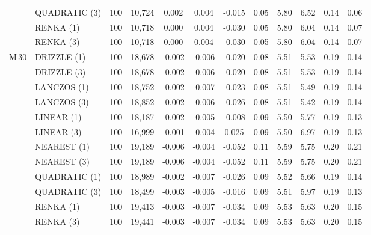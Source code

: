 \begin{table}
\begin{center}
\begin{tabular}{|l|l|c|c|c|c|c|c|c|c|c|c|}
 	              	& QUADRATIC (3)  & 100 	& 10,724 	& 0.002        & 0.004  	& -0.015 & 0.05          & 5.80  	& 6.52   		& 0.14    & 0.06    \\
 	              	& RENKA (1)           & 100 	& 10,718 	& 0.000        & 0.004  	& -0.030 & 0.05          & 5.80  	& 6.04 		& 0.14    & 0.07    \\
                		& RENKA (3)           & 100  	& 10,718 	& 0.000        & 0.004  	& -0.030 & 0.05          & 5.80  	& 6.04  		& 0.14    & 0.07    \\
\midrule
M\,30         	& DRIZZLE (1)        & 100   	& 18,678 	& -0.002       & -0.006  	& -0.020 & 0.08          & 5.51    & 5.53  		& 0.19    & 0.14    \\
 	   	       	& DRIZZLE (3)        & 100  	& 18,678 	& -0.002       & -0.006  	& -0.020 & 0.08 	 & 5.51    & 5.53  		& 0.19    & 0.14  \\
 	               	& LANCZOS (1)      & 100  	& 18,752 	& -0.002       & -0.007  	& -0.023 & 0.08          & 5.51    & 5.49  		& 0.19    & 0.14    \\
 	   	      	& LANCZOS (3)      & 100  	& 18,852 	& -0.002       & -0.006  	& -0.026 & 0.08          & 5.51    & 5.42  		& 0.19    & 0.14    \\
 	              	& LINEAR (1)          & 100    	& 18,187 	& -0.002       & -0.005  	& -0.008 & 0.09          & 5.50    & 5.77  		& 0.19    & 0.13    \\
 	              	& LINEAR (3)          & 100    	& 16,999 	& -0.001       & -0.004 	&  0.025 & 0.09          & 5.50    & 6.97 		& 0.19    & 0.13    \\
 	              	& NEAREST (1)      & 100   	& 19,189 	& -0.006       & -0.004 	& -0.052 & 0.11          & 5.59    & 5.75  		& 0.20    & 0.21    \\
 	              	& NEAREST (3)      & 100   	& 19,189 	& -0.006       & -0.004  	& -0.052 & 0.11          & 5.59    & 5.75  		& 0.20    & 0.21    \\
 	              	& QUADRATIC (1)  & 100 	& 18,989 	& -0.002       & -0.007  	& -0.026 & 0.09          & 5.52    & 5.66  		& 0.19    & 0.14    \\
 	              	& QUADRATIC (3)  & 100 	& 18,499 	& -0.003       & -0.005  	& -0.016 & 0.09          & 5.51    & 5.97   		& 0.19    & 0.13     \\
 	              	& RENKA (1)           & 100 	& 19,413 	& -0.003       & -0.007  	& -0.034 & 0.09          & 5.53    & 5.63 		& 0.20    & 0.15    \\
                		& RENKA (3)           & 100  	& 19,441 	& -0.003       & -0.007  	& -0.034 & 0.09          & 5.53    & 5.63  		& 0.20    & 0.15    \\
\bottomrule



\end{tabular}
\end{center}
\end{table}
